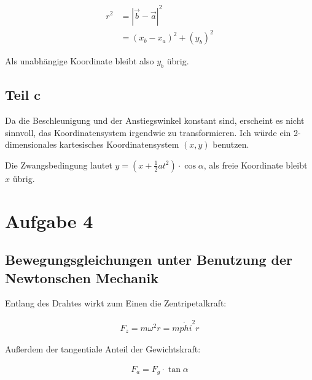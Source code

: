 \documentclass[a4paper,german,12pt,smallheadings]{scrartcl}
\begin{document}
\begin{align*}
  r^2 &= |\vec{b} - \vec{a}|^2 \\
    &= (x_b-x_a)^2 + (y_b)^2
\end{align*}

Als unabhängige Koordinate bleibt also $y_b$ übrig.


\subsection*{Teil c}
Da die Beschleunigung und der Anstiegswinkel konstant sind, erscheint es nicht
sinnvoll, das Koordinatensystem irgendwie zu transformieren. Ich würde ein
2-dimensionales kartesisches Koordinatensystem $(x, y)$ benutzen.

Die Zwangsbedingung lautet $y = (x + \frac{1}{2}at^2) \cdot \cos \alpha$, als
freie Koordinate bleibt $x$ übrig.

\section*{Aufgabe 4}

\subsection*{Bewegungsgleichungen unter Benutzung der Newtonschen Mechanik}

Entlang des Drahtes wirkt zum Einen die Zentripetalkraft:

\begin{align*}
  F_z = m \omega^2 r = m \dot{phi}^2 r
\end{align*}

Außerdem der tangentiale Anteil der Gewichtskraft:

\begin{align*}
  F_a = F_g \cdot \tan \alpha
\end{align*}
\end{document}
